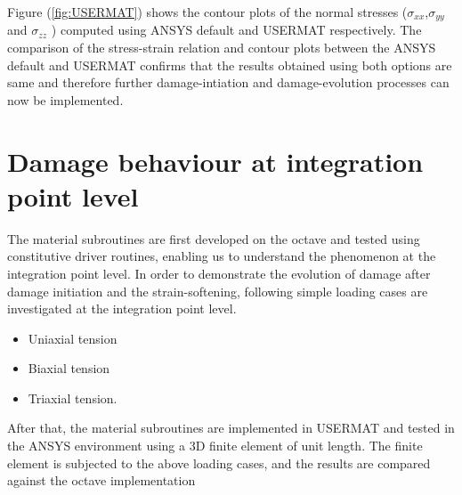 \documentclass[a4paper,12pt,twoside]{report}
\begin{document}
Figure (\ref{fig:USERMAT}) shows the contour plots of the normal stresses ($\sigma_{xx}$,$\sigma_{yy}$ and $\sigma_{zz}$ ) computed using ANSYS default and USERMAT respectively. The comparison of the stress-strain relation and contour plots between the ANSYS default and USERMAT confirms that the results obtained using both options are same and therefore further damage-intiation and damage-evolution processes can now be implemented.
\section{Damage behaviour at integration point level}
\indent\indent\indent The material subroutines are first developed on the octave and tested using constitutive driver routines, enabling us to understand the phenomenon at the integration point level. In order to demonstrate the evolution of damage after damage initiation and the strain-softening, following simple loading cases are investigated at the integration point level.
\begin{itemize}
\item Uniaxial tension
\item Biaxial tension
\item Triaxial tension.
\end{itemize} 
After that, the material subroutines are implemented in USERMAT and tested in the ANSYS environment using a 3D finite element of unit length. The finite element is subjected to the above loading cases, and the results are compared against the octave implementation
\FloatBarrier
\end{document}
